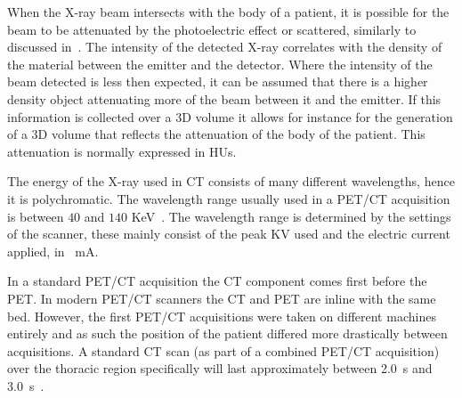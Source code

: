             When the X-ray beam intersects with the body of a patient, it is possible for the beam to be attenuated by the photoelectric effect or scattered, %
            similarly to discussed in~. The intensity of the detected X-ray correlates with the density of the material between the emitter and the detector. Where the intensity of the beam detected is less then expected, it can be assumed that there is a higher density object attenuating more of the beam between it and the emitter. If this information is collected over a \gls{3D} volume it allows for instance for the generation of a \gls{3D} volume that reflects the attenuation of the body of the patient. This attenuation is normally expressed in \glspl{HU}.
            
            The energy of the X-ray used in \gls{CT} consists of many different wavelengths, hence it is polychromatic. The wavelength range usually used in a \gls{PET}/\gls{CT} acquisition is between $40$ and $140$ \gls{KeV}~\parencite{CTattenuationenergyBib}. The wavelength range is determined by the settings of the scanner, these mainly consist of the peak \gls{KV} used and the electric current applied, in \SI{}{\milli\ampere}.
            
            In a standard \gls{PET}/\gls{CT} acquisition the \gls{CT} component comes first before the \gls{PET}. In modern \gls{PET}/\gls{CT} scanners the \gls{CT} and \gls{PET} are inline with the same bed. However, the first \gls{PET}/\gls{CT} acquisitions were taken on different machines entirely and as such the position of the patient differed more drastically between acquisitions. A standard \gls{CT} scan (as part of a combined \gls{PET}/\gls{CT} acquisition) over the thoracic region specifically will last approximately between \SI{2.0}{\second} and \SI{3.0}{\second}~\parencite{PETCTImagingTechnicalConsiderationsBib}.
        
